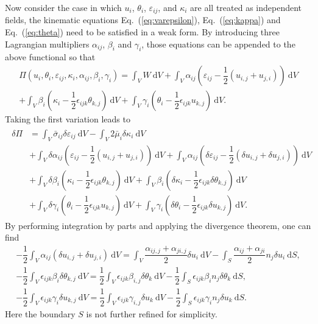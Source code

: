\documentclass[3p,sort&compress,11pt,fleqn]{elsarticle}
\newcommand*{\eqsref}[1]{Eq.~(\ref{#1})}
\newcommand*{\md}[1]{\mathrm{d}#1}
\begin{document}
Now consider the case in which $u_i$, $\theta_i$, $\varepsilon_{ij}$, and $\kappa_i$ are all treated as independent fields, the kinematic equations \eqsref{eq:varepsilon}, \eqsref{eq:kappa} and \eqsref{eq:theta} need to be satisfied in a weak form. By introducing three Lagrangian multipliers $\alpha_{ij}$, $\beta_i$ and $\gamma_i$, those equations can be appended to the above functional so that
\begin{multline}
\varPi\left(u_i,\theta_i,\varepsilon_{ij},\kappa_i,\alpha_{ij},\beta_i,\gamma_i\right)=\int_VW~\md{V}
+\int_V\alpha_{ij}\left(\varepsilon_{ij}-\dfrac{1}{2}\left(u_{i,j}+u_{j,i}\right)\right)~\md{V}\\
+\int_V\beta_i\left(\kappa_i-\dfrac{1}{2}\epsilon_{ijk}\theta_{k,j}\right)~\md{V}
+\int_V\gamma_i\left(\theta_i-\dfrac{1}{2}\epsilon_{ijk}u_{k,j}\right)~\md{V}.
\end{multline}
Taking the first variation leads to
\begin{gather}\label{eq:variation}
\begin{split}
\delta\varPi&=
\int_V\bar{\sigma}_{ij}\delta\varepsilon_{ij}~\md{V}
-\int_V2\bar{\mu}_{i}\delta\kappa_i~\md{V}\\&
+\int_V\delta{}\alpha_{ij}\left(\varepsilon_{ij}-\dfrac{1}{2}\left(u_{i,j}+u_{j,i}\right)\right)~\md{V}
+\int_V\alpha_{ij}\left(\delta{}\varepsilon_{ij}-\dfrac{1}{2}\left(\delta{}u_{i,j}+\delta{}u_{j,i}\right)\right)~\md{V}\\&
+\int_V\delta{}\beta_i\left(\kappa_i-\dfrac{1}{2}\epsilon_{ijk}\theta_{k,j}\right)~\md{V}
+\int_V\beta_i\left(\delta{}\kappa_i-\dfrac{1}{2}\epsilon_{ijk}\delta{}\theta_{k,j}\right)~\md{V}\\&
+\int_V\delta{}\gamma_i\left(\theta_i-\dfrac{1}{2}\epsilon_{ijk}u_{k,j}\right)~\md{V}
+\int_V\gamma_i\left(\delta{}\theta_i-\dfrac{1}{2}\epsilon_{ijk}\delta{}u_{k,j}\right)~\md{V}.
\end{split}
\end{gather}
By performing integration by parts and applying the divergence theorem, one can find
\begin{gather}
-\dfrac{1}{2}\int_V\alpha_{ij}\left(\delta{}u_{i,j}+\delta{}u_{j,i}\right)~\md{V}=\int_V\dfrac{\alpha_{ij,j}+\alpha_{ji,j}}{2}\delta{}u_i~\md{V}-\int_S\dfrac{\alpha_{ij}+\alpha_{ji}}{2}n_j\delta{}u_i~\md{S},\\
-\dfrac{1}{2}\int_V\epsilon_{ijk}\beta_i\delta\theta_{k,j}~\md{V}=\dfrac{1}{2}\int_V\epsilon_{ijk}\beta_{i,j}\delta\theta_k~\md{V}-\dfrac{1}{2}\int_S\epsilon_{ijk}\beta_in_j\delta\theta_k~\md{S},\\
-\dfrac{1}{2}\int_V\epsilon_{ijk}\gamma_i\delta{}u_{k,j}~\md{V}=\dfrac{1}{2}\int_V\epsilon_{ijk}\gamma_{i,j}\delta{}u_k~\md{V}-\dfrac{1}{2}\int_S\epsilon_{ijk}\gamma_in_j\delta{}u_k~\md{S}.
\end{gather}
Here the boundary $S$ is not further refined for simplicity.
\end{document}

